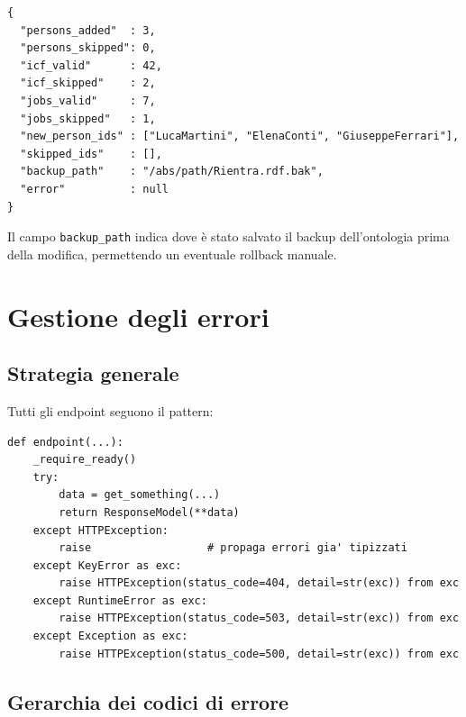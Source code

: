 \documentclass[a4paper,12pt]{article}
\begin{document}
\begin{lstlisting}[caption={Struttura della risposta di \texttt{POST /import/workers}.}]
{
  "persons_added"  : 3,
  "persons_skipped": 0,
  "icf_valid"      : 42,
  "icf_skipped"    : 2,
  "jobs_valid"     : 7,
  "jobs_skipped"   : 1,
  "new_person_ids" : ["LucaMartini", "ElenaConti", "GiuseppeFerrari"],
  "skipped_ids"    : [],
  "backup_path"    : "/abs/path/Rientra.rdf.bak",
  "error"          : null
}
\end{lstlisting}

\noindent Il campo \texttt{backup\_path} indica dove \`{e} stato salvato il backup
dell'ontologia prima della modifica, permettendo un eventuale rollback
manuale.

\section{Gestione degli errori}

\subsection{Strategia generale}

Tutti gli endpoint seguono il pattern:

\begin{lstlisting}[caption={Pattern di gestione degli errori degli endpoint.}]
def endpoint(...):
    _require_ready()
    try:
        data = get_something(...)
        return ResponseModel(**data)
    except HTTPException:
        raise                  # propaga errori gia' tipizzati
    except KeyError as exc:
        raise HTTPException(status_code=404, detail=str(exc)) from exc
    except RuntimeError as exc:
        raise HTTPException(status_code=503, detail=str(exc)) from exc
    except Exception as exc:
        raise HTTPException(status_code=500, detail=str(exc)) from exc
\end{lstlisting}

\noindent \subsection{Gerarchia dei codici di errore}
\end{document}
